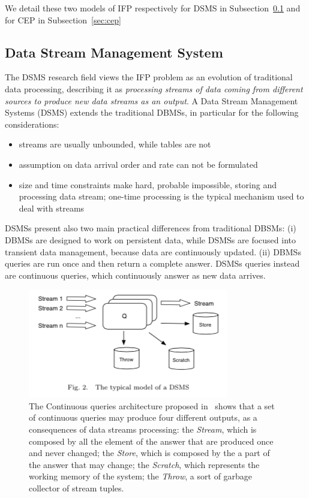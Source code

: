 We detail these two models of IFP respectively for DSMS in Subsection~\ref{sec:dsms} and for CEP in Subsection~\ref{sec:cep}

\subsection{Data Stream Management System}\label{sec:dsms}
The DSMS research field views the IFP problem as an evolution of traditional data processing, describing it as \textit{processing streams of data coming from different sources to produce new data streams as an output}. A Data Stream Management Systems (DSMS) extends the traditional DBMSs, in particular for the following considerations:

\begin{itemize}
\item streams are usually unbounded, while tables are not
\item assumption on data arrival order and rate can not be formulated
\item size and time constraints make hard, probable impossible, storing and processing data stream; one-time processing is the typical mechanism used to deal with streams
\end{itemize} 

DSMSs present also two main practical differences from traditional DBSMs: (i) DBMSs are designed to work on persistent data, while DSMSs are focused into transient data management, because data are continuously updated. (ii) DBMSs queries are run once and then return a complete answer. DSMSs queries instead are continuous queries, which continuously answer as new data arrives. 

\begin{figure}[tbh]
  \centering
	\includegraphics[width=0.75\linewidth]{images/dsms}
	\caption[General Continuous Queries Architecture]{The Continuous queries architecture proposed in~\cite{Babu:2001:CQO:603867.603884} shows that  a set of continuous queries may produce four different outputs, as a consequences of data streams processing: the \textit{Stream}, which is composed by all the element of the answer that are produced once and never changed; the \textit{Store}, which is composed by the a part of the answer that may change; the \textit{Scratch}, which represents the working memory of the system; the \textit{Throw}, a sort of garbage collector of stream tuples.} 
  	\label{fig:dsms}
\end{figure}

